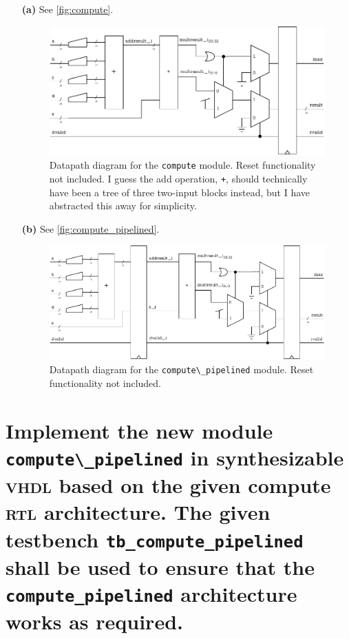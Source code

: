 \documentclass[british,fleqn]{article}
\begin{document}
\setlength{\leftmargini}{4em}%
\begin{itemize}
  \item[\bfseries(a)] See \autoref{fig:compute}.
    \begin{figure}
      \includegraphics{compute.pdf}
      \caption{Datapath diagram for the \lstinline{compute} module. Reset
      functionality not included. I guess the add operation, \lstinline{+},
      should technically have been a tree of three two-input blocks instead,
      but I have abstracted this away for simplicity.}
      \label{fig:compute}
    \end{figure}
  \item[\bfseries(b)] See \autoref{fig:compute_pipelined}.
    \begin{figure}
      \includegraphics{compute_pipelined.pdf}
      \caption{Datapath diagram for the \lstinline{compute\_pipelined} module.
      Reset functionality not included.}
      \label{fig:compute_pipelined}
    \end{figure}
\end{itemize}

\section[Task 6]{%
  Implement the new module \lstinline{compute\_pipelined} in synthesizable
  \textsc{vhdl} based on the given compute \textsc{rtl} architecture. The given
  testbench \lstinline{tb_compute_pipelined} shall be used to ensure that the
  \lstinline{compute_pipelined} architecture works as required.%
}
\end{document}
